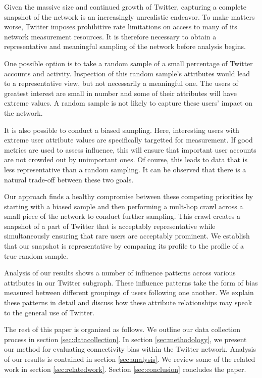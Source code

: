 Given the massive size and continued growth of Twitter, capturing a complete snapshot of the network is an increasingly unrealistic endeavor.  To make matters worse, Twitter imposes prohibitive rate limitations on access to many of its network measurement resources.  It is therefore necessary to obtain a representative and meaningful sampling of the network before analysis begins.

One possible option is to take a random sample of a small percentage of Twitter accounts and activity.  Inspection of this random sample's attributes would lead to a representative view, but not necessarily a meaningful one.  The users of greatest interest are small in number and some of their attributes will have extreme values.  A random sample is not likely to capture these users' impact on the network.

It is also possible to conduct a biased sampling.  Here, interesting users with extreme user attribute values are specifically targetted for measurement.  If good metrics are used to assess influence, this will ensure that important user accounts are not crowded out by unimportant ones.  Of course, this leads to data that is less representative than a random sampling.  It can be observed that there is a natural trade-off between these two goals.

Our approach finds a healthy compromise between these competing priorities by starting with a biased sample and then performing a mult-hop crawl across a small piece of the network to conduct further sampling.  This crawl creates a snapshot of a part of Twitter that is acceptably representative while simultaneously ensuring that rare users are acceptably prominent.  We establish that our snapshot is representative by comparing its profile to the profile of a true random sample.

Analysis of our results shows a number of influence patterns across various attributes in our Twitter subgraph.  These influence patterns take the form of bias measured between different groupings of users following one another.  We explain these patterns in detail and discuss how these attribute relationships may speak to the general use of Twitter.

The rest of this paper is organized as follows.  We outline our data collection process in section \ref{sec:datacollection}.  In section \ref{sec:methodology}, we present our method for evaluating connectivity bias within the Twitter network.  Analysis of our results is contained in section \ref{sec:analysis}.  We review some of the related work in section \ref{sec:relatedwork}.  Section \ref{sec:conclusion} concludes the paper.